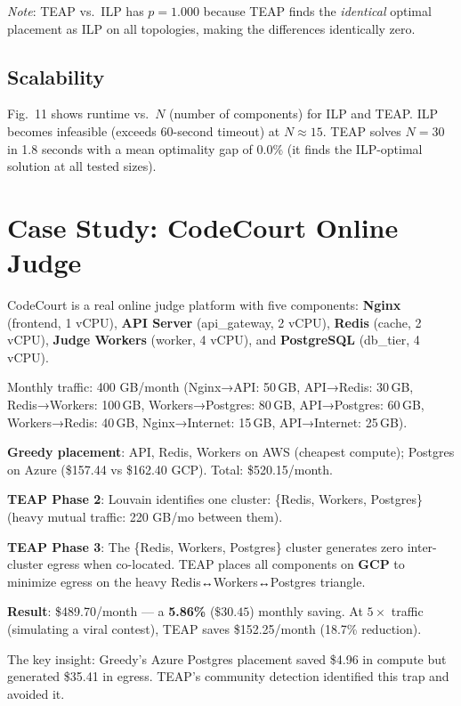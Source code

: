 \documentclass[10pt,journal,compsoc]{IEEEtran}
\begin{document}
\textit{Note}: TEAP vs.\ ILP has $p = 1.000$ because TEAP finds the
\emph{identical} optimal placement as ILP on all topologies, making the
differences identically zero.

\subsection{Scalability}

Fig.~11 shows runtime vs.\ $N$ (number of components) for ILP and TEAP.
ILP becomes infeasible (exceeds 60-second timeout) at $N \approx 15$.
TEAP solves $N = 30$ in 1.8 seconds with a mean optimality gap of 0.0\%
(it finds the ILP-optimal solution at all tested sizes).

\section{Case Study: CodeCourt Online Judge}
\label{sec:casestudy}

CodeCourt is a real online judge platform with five components:
\textbf{Nginx} (frontend, 1 vCPU), \textbf{API Server} (api\_gateway, 2 vCPU),
\textbf{Redis} (cache, 2 vCPU), \textbf{Judge Workers} (worker, 4 vCPU),
and \textbf{PostgreSQL} (db\_tier, 4 vCPU).

Monthly traffic: 400 GB/month (Nginx→API: 50\,GB, API→Redis: 30\,GB,
Redis→Workers: 100\,GB, Workers→Postgres: 80\,GB, API→Postgres: 60\,GB,
Workers→Redis: 40\,GB, Nginx→Internet: 15\,GB, API→Internet: 25\,GB).

\textbf{Greedy placement}: API, Redis, Workers on AWS (cheapest compute);
Postgres on Azure (\$157.44 vs \$162.40 GCP).
Total: \$520.15/month.

\textbf{TEAP Phase 2}: Louvain identifies one cluster: \{Redis,
Workers, Postgres\} (heavy mutual traffic: 220 GB/mo between them).

\textbf{TEAP Phase 3}: The \{Redis, Workers, Postgres\} cluster generates
zero inter-cluster egress when co-located. TEAP places all components on
\textbf{GCP} to minimize egress on the heavy Redis↔Workers↔Postgres triangle.

\textbf{Result}: \$489.70/month — a \textbf{5.86\%} ($\$30.45$) monthly saving.
At $5\times$ traffic (simulating a viral contest), TEAP saves \$152.25/month
(18.7\% reduction).

The key insight: Greedy's Azure Postgres placement saved \$4.96 in compute
but generated \$35.41 in egress. TEAP's community detection identified this
trap and avoided it.
\end{document}

